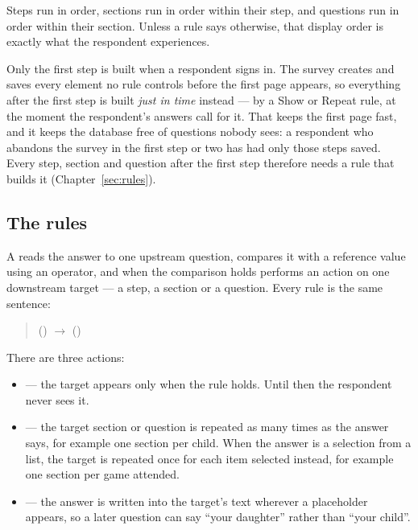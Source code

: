 \documentclass[11pt, a4paper]{article}
\begin{document}
Steps run in order, sections run in order within their step, and questions run in order within
their section. Unless a rule says otherwise, that display order is exactly what the respondent
experiences.

Only the first step is built when a respondent signs in. The survey creates and saves every
element no rule controls before the first page appears, so everything after the first step is
built \emph{just in time} instead — by a Show or Repeat rule, at the moment the respondent's
answers call for it. That keeps the first page fast, and it keeps the database free of questions
nobody sees: a respondent who abandons the survey in the first step or two has had only those
steps saved. Every step, section and question after the first step therefore needs a rule that
builds it (Chapter~\ref{sec:rules}).

\subsection{The rules}

A  reads the answer to one upstream question, compares it with a reference value using
an operator, and when the comparison holds performs an action on one downstream target — a step,
a section or a question. Every rule is the same sentence:

\begin{quote}
 \; () \;  \; $\rightarrow$ \; () \; 
\end{quote}

There are three actions:

\begin{itemize}
  \item {} — the target appears only when the rule holds. Until then the respondent
        never sees it.
  \item {} — the target section or question is repeated as many times as the answer
        says, for example one  section per child. When the answer is a selection from
        a list, the target is repeated once for each item selected instead, for example one
         section per game attended.
  \item {} — the answer is written into the target's text wherever a
         placeholder appears, so a later question can say
        “your daughter” rather than “your child”.
\end{itemize}
\end{document}

